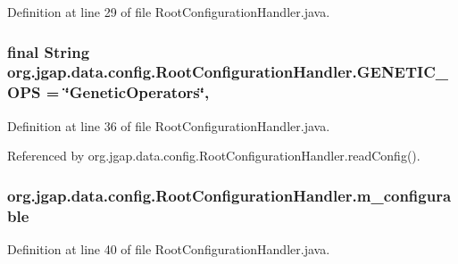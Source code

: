 Definition at line 29 of file Root\-Configuration\-Handler.\-java.

\hypertarget{classorg_1_1jgap_1_1data_1_1config_1_1_root_configuration_handler_a93ca2e0367ff5f34c81dccbd91d36cb5}{
\subsubsection[{G\-E\-N\-E\-T\-I\-C\-\_\-\-O\-P\-S}]{\setlength{\rightskip}{0pt plus 5cm}final String org.\-jgap.\-data.\-config.\-Root\-Configuration\-Handler.\-G\-E\-N\-E\-T\-I\-C\-\_\-\-O\-P\-S = \char`\"{}Genetic\-Operators\char`\"{}\hspace{0.3cm}{\ttfamily [static]}, {\ttfamily [private]}}}\label{classorg_1_1jgap_1_1data_1_1config_1_1_root_configuration_handler_a93ca2e0367ff5f34c81dccbd91d36cb5}


Definition at line 36 of file Root\-Configuration\-Handler.\-java.



Referenced by org.\-jgap.\-data.\-config.\-Root\-Configuration\-Handler.\-read\-Config().

\hypertarget{classorg_1_1jgap_1_1data_1_1config_1_1_root_configuration_handler_a002b9a34f2fdf33648eb5f341a1816fa}{
\subsubsection[{m\-\_\-configurable}]{ org.\-jgap.\-data.\-config.\-Root\-Configuration\-Handler.\-m\-\_\-configurable\hspace{0.3cm}{\ttfamily [private]}}}\label{classorg_1_1jgap_1_1data_1_1config_1_1_root_configuration_handler_a002b9a34f2fdf33648eb5f341a1816fa}


Definition at line 40 of file Root\-Configuration\-Handler.\-java.



